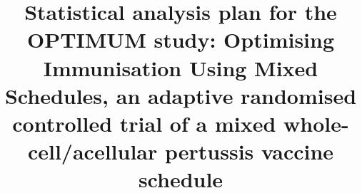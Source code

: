\documentclass{bmcart}
\begin{document}
\begin{frontmatter}

\begin{fmbox}


\title{Statistical analysis plan for the OPTIMUM study: Optimising Immunisation Using Mixed Schedules, an adaptive randomised controlled trial of a mixed whole-cell/acellular pertussis vaccine schedule}


\author[
  addressref={aff1},                   %
  corref={aff1},                       %
  email={james.totterdell@sydney.edu.au}   %
]{}
\author[
  addressref={aff2},
  corref={aff2},
  email={@telethonkids.org.au}
]{}
\author[
	addressref={aff2},
	email={...}
]{}
\author[
	addressref={aff2},
	email={...}
]{}
\author[
	addressref={aff1},
	corref={aff1},
	email={...}
]{}



\end{fmbox}
\end{frontmatter}
\end{document}
